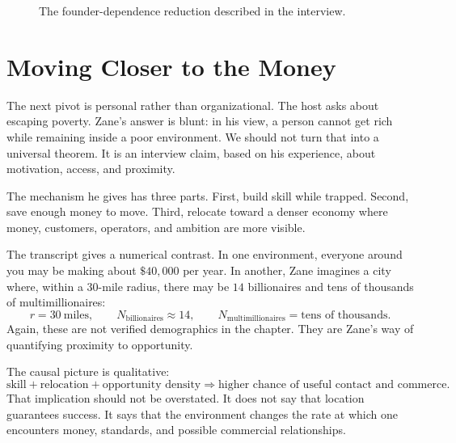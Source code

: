 \begin{figure}
\centering
{}
\caption{The founder-dependence reduction described in the interview.}
\end{figure}

\section{Moving Closer to the Money}

The next pivot is personal rather than organizational. The host asks about escaping poverty. Zane's answer is blunt: in his view, a person cannot get rich while remaining inside a poor environment. We should not turn that into a universal theorem. It is an interview claim, based on his experience, about motivation, access, and proximity.

The mechanism he gives has three parts. First, build skill while trapped. Second, save enough money to move. Third, relocate toward a denser economy where money, customers, operators, and ambition are more visible.

The transcript gives a numerical contrast. In one environment, everyone around you may be making about \(\$40{,}000\) per year. In another, Zane imagines a city where, within a \(30\)-mile radius, there may be \(14\) billionaires and tens of thousands of multimillionaires:
\begin{equation}
r=30\ \mathrm{miles},\qquad
N_{\mathrm{billionaires}}\approx 14,\qquad
N_{\mathrm{multimillionaires}}=\text{tens of thousands}.
\end{equation}
Again, these are not verified demographics in the chapter. They are Zane's way of quantifying proximity to opportunity.

The causal picture is qualitative:
\begin{equation}
\text{skill}+\text{relocation}+\text{opportunity density}
\Rightarrow
\text{higher chance of useful contact and commerce}.
\end{equation}
That implication should not be overstated. It does not say that location guarantees success. It says that the environment changes the rate at which one encounters money, standards, and possible commercial relationships.

